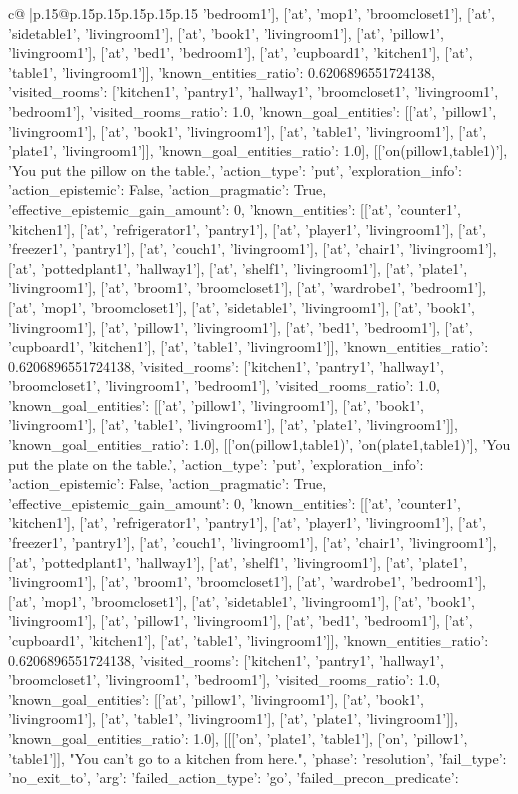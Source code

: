 \documentclass{article}
\begin{document}
{\begin{supertabular}{c@{$\;$}|p{.15\linewidth}@{}p{.15\linewidth}p{.15\linewidth}p{.15\linewidth}p{.15\linewidth}p{.15\linewidth}}
{{{'bedroom1'], ['at', 'mop1', 'broomcloset1'], ['at', 'sidetable1', 'livingroom1'], ['at', 'book1', 'livingroom1'], ['at', 'pillow1', 'livingroom1'], ['at', 'bed1', 'bedroom1'], ['at', 'cupboard1', 'kitchen1'], ['at', 'table1', 'livingroom1']], 'known_entities_ratio': 0.6206896551724138, 'visited_rooms': ['kitchen1', 'pantry1', 'hallway1', 'broomcloset1', 'livingroom1', 'bedroom1'], 'visited_rooms_ratio': 1.0, 'known_goal_entities': [['at', 'pillow1', 'livingroom1'], ['at', 'book1', 'livingroom1'], ['at', 'table1', 'livingroom1'], ['at', 'plate1', 'livingroom1']], 'known_goal_entities_ratio': 1.0}}], [['on(pillow1,table1)'], 'You put the pillow on the table.', {'action_type': 'put', 'exploration_info': {'action_epistemic': False, 'action_pragmatic': True, 'effective_epistemic_gain_amount': 0, 'known_entities': [['at', 'counter1', 'kitchen1'], ['at', 'refrigerator1', 'pantry1'], ['at', 'player1', 'livingroom1'], ['at', 'freezer1', 'pantry1'], ['at', 'couch1', 'livingroom1'], ['at', 'chair1', 'livingroom1'], ['at', 'pottedplant1', 'hallway1'], ['at', 'shelf1', 'livingroom1'], ['at', 'plate1', 'livingroom1'], ['at', 'broom1', 'broomcloset1'], ['at', 'wardrobe1', 'bedroom1'], ['at', 'mop1', 'broomcloset1'], ['at', 'sidetable1', 'livingroom1'], ['at', 'book1', 'livingroom1'], ['at', 'pillow1', 'livingroom1'], ['at', 'bed1', 'bedroom1'], ['at', 'cupboard1', 'kitchen1'], ['at', 'table1', 'livingroom1']], 'known_entities_ratio': 0.6206896551724138, 'visited_rooms': ['kitchen1', 'pantry1', 'hallway1', 'broomcloset1', 'livingroom1', 'bedroom1'], 'visited_rooms_ratio': 1.0, 'known_goal_entities': [['at', 'pillow1', 'livingroom1'], ['at', 'book1', 'livingroom1'], ['at', 'table1', 'livingroom1'], ['at', 'plate1', 'livingroom1']], 'known_goal_entities_ratio': 1.0}}], [['on(pillow1,table1)', 'on(plate1,table1)'], 'You put the plate on the table.', {'action_type': 'put', 'exploration_info': {'action_epistemic': False, 'action_pragmatic': True, 'effective_epistemic_gain_amount': 0, 'known_entities': [['at', 'counter1', 'kitchen1'], ['at', 'refrigerator1', 'pantry1'], ['at', 'player1', 'livingroom1'], ['at', 'freezer1', 'pantry1'], ['at', 'couch1', 'livingroom1'], ['at', 'chair1', 'livingroom1'], ['at', 'pottedplant1', 'hallway1'], ['at', 'shelf1', 'livingroom1'], ['at', 'plate1', 'livingroom1'], ['at', 'broom1', 'broomcloset1'], ['at', 'wardrobe1', 'bedroom1'], ['at', 'mop1', 'broomcloset1'], ['at', 'sidetable1', 'livingroom1'], ['at', 'book1', 'livingroom1'], ['at', 'pillow1', 'livingroom1'], ['at', 'bed1', 'bedroom1'], ['at', 'cupboard1', 'kitchen1'], ['at', 'table1', 'livingroom1']], 'known_entities_ratio': 0.6206896551724138, 'visited_rooms': ['kitchen1', 'pantry1', 'hallway1', 'broomcloset1', 'livingroom1', 'bedroom1'], 'visited_rooms_ratio': 1.0, 'known_goal_entities': [['at', 'pillow1', 'livingroom1'], ['at', 'book1', 'livingroom1'], ['at', 'table1', 'livingroom1'], ['at', 'plate1', 'livingroom1']], 'known_goal_entities_ratio': 1.0}}], [[['on', 'plate1', 'table1'], ['on', 'pillow1', 'table1']], "You can't go to a kitchen from here.", {'phase': 'resolution', 'fail_type': 'no_exit_to', 'arg': {'failed_action_type': 'go', 'failed_precon_predicate': }}}
\end{supertabular}}
\end{document}
